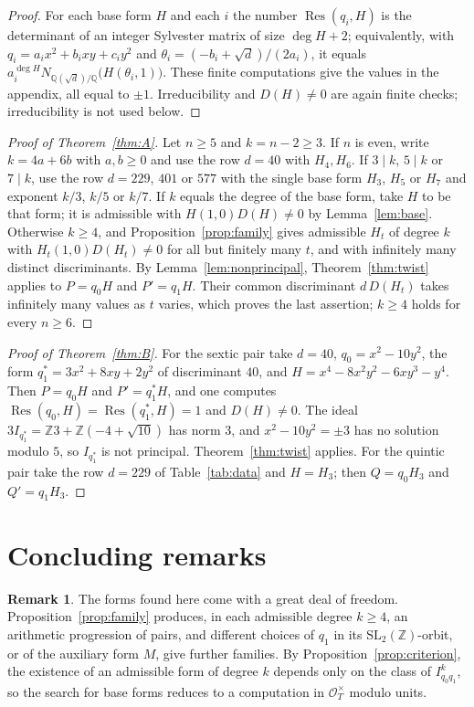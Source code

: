 \documentclass[11pt]{amsart}
\theoremstyle{definition}
\newtheorem{remark}[theorem]{Remark}
\newcommand{\ZZ}{\mathbb{Z}}
\newcommand{\QQ}{\mathbb{Q}}
\newcommand{\OO}{\mathcal{O}}
\DeclareMathOperator{\Res}{Res}
\begin{document}
\begin{proof}
For each base form $H$ and each $i$ the number $\Res(q_i,H)$ is the determinant of an integer Sylvester matrix of size $\deg H+2$; equivalently, with $q_i=a_ix^2+b_ixy+c_iy^2$ and $\theta_i=(-b_i+\sqrt d)/(2a_i)$, it equals $a_i^{\deg H}N_{\QQ(\sqrt d)/\QQ}\bigl(H(\theta_i,1)\bigr)$. These finite computations give the values in the appendix, all equal to $\pm1$. Irreducibility and $D(H)\neq0$ are again finite checks; irreducibility is not used below.
\end{proof}

\begin{proof}[Proof of Theorem~\ref{thm:A}]
Let $n\ge5$ and $k=n-2\ge3$. If $n$ is even, write $k=4a+6b$ with $a,b\ge0$ and use the row $d=40$ with $H_4,H_6$. If $3\mid k$, $5\mid k$ or $7\mid k$, use the row $d=229$, $401$ or $577$ with the single base form $H_3$, $H_5$ or $H_7$ and exponent $k/3$, $k/5$ or $k/7$. If $k$ equals the degree of the base form, take $H$ to be that form; it is admissible with $H(1,0)D(H)\neq0$ by Lemma~\ref{lem:base}. Otherwise $k\ge4$, and Proposition~\ref{prop:family} gives admissible $H_t$ of degree $k$ with $H_t(1,0)D(H_t)\neq0$ for all but finitely many $t$, and with infinitely many distinct discriminants. By Lemma~\ref{lem:nonprincipal}, Theorem~\ref{thm:twist} applies to $P=q_0H$ and $P'=q_1H$. Their common discriminant $d\,D(H_t)$ takes infinitely many values as $t$ varies, which proves the last assertion; $k\ge4$ holds for every $n\ge6$.
\end{proof}

\begin{proof}[Proof of Theorem~\ref{thm:B}]
For the sextic pair take $d=40$, $q_0=x^2-10y^2$, the form $q_1^\ast=3x^2+8xy+2y^2$ of discriminant $40$, and $H=x^4-8x^2y^2-6xy^3-y^4$. Then $P=q_0H$ and $P'=q_1^\ast H$, and one computes $\Res(q_0,H)=\Res(q_1^\ast,H)=1$ and $D(H)\neq0$. The ideal $3I_{q_1^\ast}=\ZZ3+\ZZ(-4+\sqrt{10})$ has norm $3$, and $x^2-10y^2=\pm3$ has no solution modulo $5$, so $I_{q_1^\ast}$ is not principal. Theorem~\ref{thm:twist} applies. For the quintic pair take the row $d=229$ of Table~\ref{tab:data} and $H=H_3$; then $Q=q_0H_3$ and $Q'=q_1H_3$.
\end{proof}

\section{Concluding remarks}\label{sec:end}

\begin{remark}
The forms found here come with a great deal of freedom. Proposition~\ref{prop:family} produces, in each admissible degree $k\ge4$, an arithmetic progression of pairs, and different choices of $q_1$ in its $\mathrm{SL}_2(\ZZ)$-orbit, or of the auxiliary form $M$, give further families. By Proposition~\ref{prop:criterion}, the existence of an admissible form of degree $k$ depends only on the class of $I_{q_0q_1}^k$, so the search for base forms reduces to a computation in $\OO_T^\times$ modulo units.
\end{remark}
\end{document}
